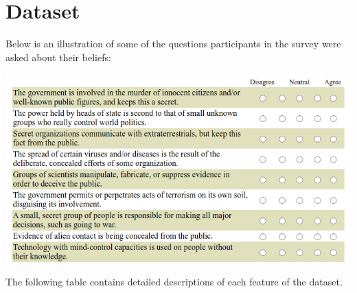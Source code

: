 \documentclass{article}[11pt]
\begin{document}
\section*{Dataset}
Below is an illustration of some of the questions participants in the survey were asked about their beliefs:\\
\begin{center}
\includegraphics[scale=1.1]{"../survey.png"}\\
\end{center}
The following table contains detailed descriptions of each feature of the dataset.
\newpage
\end{document}
